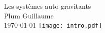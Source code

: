 \begin{titlepage}
\begin{center}
		\Huge Les systèmes auto-gravitants \\
		\Large Plum Guillaume \\
		\today
	\vfill
			\centering \texttt{[image: intro.pdf]}
	\end{center}
	\thispagestyle{empty}
\end{titlepage}
